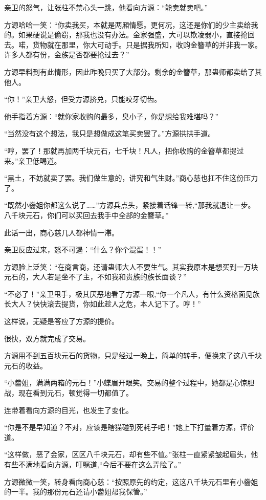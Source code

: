 \begin{this_body}
亲卫的怒气，让张柱不禁心头一跳，他看向方源：“能卖就卖吧。”

方源哈哈一笑：“你卖我买，本就是两厢情愿。更何况，这还是你们的少主卖给我的。如果硬说是偷窃，那我也没有办法。金家强盛，大可以欺凌弱小，直接抢回去。喏，货物就在那里，你大可动手。只是据我所知，收购金簪草的并非我一家。许多人都有份，金族是否都要抢过去？”

方源早料到有此情形，因此昨晚只买了大部分。剩余的金簪草，那蛊师都卖给了其他人。

“你！”亲卫大怒，但受方源挤兑，只能咬牙切齿。

他手指着方源：“就你家收购的最多，臭小子，你是想给我难堪吗？”

“当然没有这个想法，我只是想做成这笔买卖罢了。”方源拱拱手道。

“哼，罢了！那就再加两千块元石，七千块！凡人，把你收购的金簪草都提过来。”亲卫低喝道。

“黑土，不妨就卖了罢。我们做生意的，讲究和气生财。”商心慈也扛不住这份压力了。

“既然小齤姐你都这么说了……”方源兵点头，紧接着话锋一转,“那我就退让一步。八千块元石，你们可以买回去我手中全部的金簪草。”

此话一出，商心慈几人都神情一滞。

亲卫反应过来，怒不可遏：“什么？你个混蛋！！”

方源脸上泛笑：“在商言商，还请蛊师大人不要生气。其实我原本是想买到一万块元石的，大人若是坐不了主，不如我和贵族的族长面谈？”

“不必了！”亲卫甩手，极其厌恶地看了方源一眼,“你一个凡人，有什么资格面见族长大人？快快滚去提货，你如此趁人之危，本人记下了。哼！”

这样说，无疑是答应了方源的提价。

很快，双方就完成了交易。

方源用不到五百块元石的货物，只是经过一晚上，简单的转手，便换来了这八千块元石的收益。

“小齤姐，满满两箱的元石！”小蝶眉开眼笑。交易的整个过程中，她都是心惊胆战，现在看到元石，顿觉得一切都值了。

连带着看向方源的目光，也发生了变化。

“你是不是早知道？不对，应该是瞎猫碰到死耗子吧！”她上下打量着方源，评价道。

“这样做，恶了金家，区区八千块元石，却有些不值。”张柱一直紧紧皱起眉头，他有些不满地看向方源，叮嘱道,“今后不要在这么弄险了。”

方源微微一笑，转身看向商心慈：“按照原先的约定，这这八千块元石里有小齤姐的一半。我的那份元石还请小齤姐帮我保管。”


\end{this_body}
